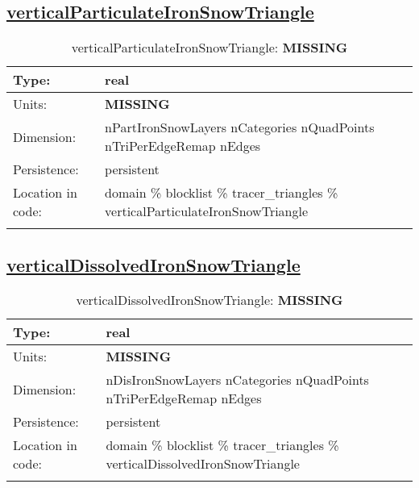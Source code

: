 \subsection[verticalParticulateIronSnowTriangle]{\hyperref[sec:var_tab_tracer_triangles]{verticalParticulateIronSnowTriangle}}
\label{subsec:var_sec_tracer_triangles_verticalParticulateIronSnowTriangle}
\begin{center}
\begin{longtable}{| p{2.0in} | p{4.0in} |}
        \hline 
        Type: & real \\
        \hline 
        Units: & {\bf \color{red} MISSING} \\
        \hline 
        Dimension: & nPartIronSnowLayers nCategories nQuadPoints nTriPerEdgeRemap nEdges \\
        \hline 
        Persistence: & persistent \\
        \hline 
         Location in code: & domain \% blocklist \% tracer\_triangles \% verticalParticulateIronSnowTriangle \\
         \hline 
    \caption{verticalParticulateIronSnowTriangle: {\bf \color{red} MISSING}}
\end{longtable}
\end{center}
\subsection[verticalDissolvedIronSnowTriangle]{\hyperref[sec:var_tab_tracer_triangles]{verticalDissolvedIronSnowTriangle}}
\label{subsec:var_sec_tracer_triangles_verticalDissolvedIronSnowTriangle}
\begin{center}
\begin{longtable}{| p{2.0in} | p{4.0in} |}
        \hline 
        Type: & real \\
        \hline 
        Units: & {\bf \color{red} MISSING} \\
        \hline 
        Dimension: & nDisIronSnowLayers nCategories nQuadPoints nTriPerEdgeRemap nEdges \\
        \hline 
        Persistence: & persistent \\
        \hline 
         Location in code: & domain \% blocklist \% tracer\_triangles \% verticalDissolvedIronSnowTriangle \\
         \hline 
    \caption{verticalDissolvedIronSnowTriangle: {\bf \color{red} MISSING}}
\end{longtable}
\end{center}
